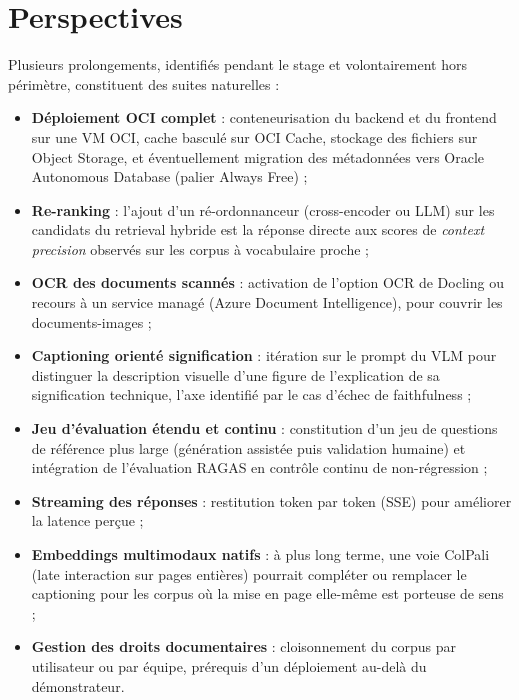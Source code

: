 \chapter*{Perspectives}

Plusieurs prolongements, identifiés pendant le stage et volontairement hors périmètre,
constituent des suites naturelles :

\begin{itemize}
  \item \textbf{Déploiement OCI complet} : conteneurisation du backend et du frontend sur
        une VM OCI, cache basculé sur OCI Cache, stockage des fichiers sur Object Storage,
        et éventuellement migration des métadonnées vers Oracle Autonomous Database
        (palier Always Free) ;
  \item \textbf{Re-ranking} : l'ajout d'un ré-ordonnanceur (cross-encoder ou LLM) sur les
        candidats du retrieval hybride est la réponse directe aux scores de
        \emph{context precision} observés sur les corpus à vocabulaire proche ;
  \item \textbf{OCR des documents scannés} : activation de l'option OCR de Docling ou
        recours à un service managé (Azure Document Intelligence), pour couvrir les
        documents-images ;
  \item \textbf{Captioning orienté signification} : itération sur le prompt du VLM pour
        distinguer la description visuelle d'une figure de l'explication de sa
        signification technique, l'axe identifié par le cas d'échec de faithfulness ;
  \item \textbf{Jeu d'évaluation étendu et continu} : constitution d'un jeu de questions
        de référence plus large (génération assistée puis validation humaine) et
        intégration de l'évaluation RAGAS en contrôle continu de non-régression ;
  \item \textbf{Streaming des réponses} : restitution token par token (SSE) pour améliorer
        la latence perçue ;
  \item \textbf{Embeddings multimodaux natifs} : à plus long terme, une voie ColPali
        (late interaction sur pages entières) pourrait compléter ou remplacer le
        captioning pour les corpus où la mise en page elle-même est porteuse de sens ;
  \item \textbf{Gestion des droits documentaires} : cloisonnement du corpus par
        utilisateur ou par équipe, prérequis d'un déploiement au-delà du démonstrateur.
\end{itemize}

